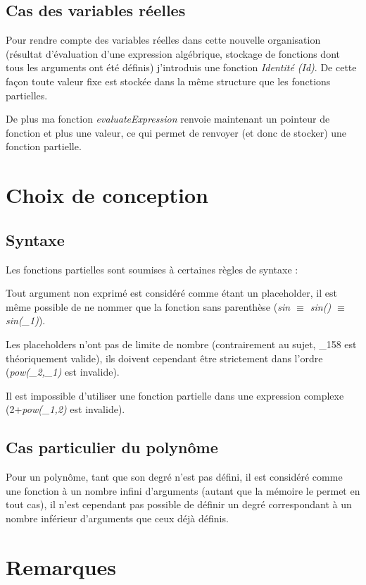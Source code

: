 \documentclass[]{article}
\begin{document}
\subsection{Cas des variables réelles}
Pour rendre compte des variables réelles dans cette nouvelle organisation (résultat d'évaluation d'une expression algébrique, stockage de fonctions dont tous les arguments ont été définis) j'introduis une fonction \textit{Identité (Id)}. De cette façon toute valeur fixe est stockée dans la même structure que les fonctions partielles.

De plus ma fonction \textit{evaluateExpression} renvoie maintenant un pointeur de fonction et plus une valeur, ce qui permet de renvoyer (et donc de stocker) une fonction partielle.

\section{Choix de conception}
\subsection{Syntaxe}
Les fonctions partielles sont soumises à certaines règles de syntaxe :

Tout argument non exprimé est considéré comme étant un placeholder, il est même possible de ne nommer que la fonction sans parenthèse (\textit{sin $\equiv$ sin() $\equiv$ sin(\_1)}).

Les placeholders n'ont pas de limite de nombre (contrairement au sujet, \_158 est théoriquement valide), ils doivent cependant être strictement dans l'ordre (\textit{pow(\_2,\_1)} est invalide).

Il est impossible d'utiliser une fonction partielle dans une expression complexe (2+\textit{pow(\_1,2)} est invalide).

\subsection{Cas particulier du polynôme}
Pour un polynôme, tant que son degré n'est pas défini, il est considéré comme une fonction à un nombre infini d'arguments  (autant que la mémoire le permet en tout cas), il n'est cependant pas possible de définir un degré correspondant à un nombre inférieur d'arguments que ceux déjà définis.

\section{Remarques}
\end{document}

